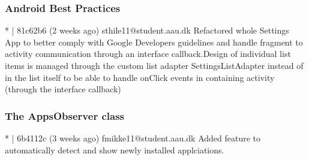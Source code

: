 \subsubsection{Android Best Practices}
* | 81c62b6 (2 weeks ago) sthile11@student.aau.dk Refactored whole Settings App to better comply with Google Developers guidelines and handle fragment to activity communication through an interface callback.Design of individual list items is managed through the custom list adapter SettingsListAdapter instead of in the list itself to be able to handle onClick events in containing activity (through the interface
 callback)\\
 
 \subsubsection{The AppsObserver class}
 * | 6b4112c (3 weeks ago) fmikke11@student.aau.dk Added feature to automatically detect and show newly installed applciations.
